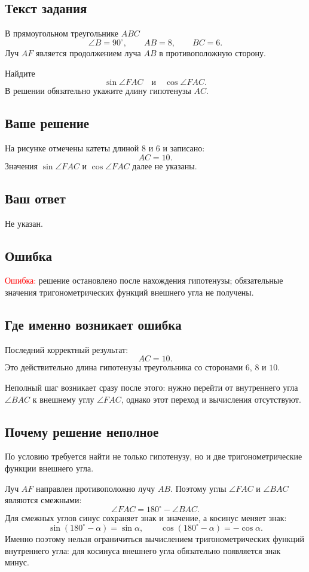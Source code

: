 \documentclass[12pt,a4paper]{article}
\begin{document}
\subsection*{Текст задания}
В прямоугольном треугольнике $ABC$
\[
\angle B=90^\circ,\qquad AB=8,\qquad BC=6.
\]
Луч $AF$ является продолжением луча $AB$ в противоположную сторону.

Найдите
\[
\sin\angle FAC
\quad\text{и}\quad
\cos\angle FAC.
\]
В решении обязательно укажите длину гипотенузы $AC$.

\subsection*{Ваше решение}
На рисунке отмечены катеты длиной $8$ и $6$ и записано:
\[
AC=10.
\]
Значения $\sin\angle FAC$ и $\cos\angle FAC$ далее не указаны.

\subsection*{Ваш ответ}
Не указан.

\subsection*{Ошибка}
\textcolor{red}{Ошибка:} решение остановлено после нахождения гипотенузы; обязательные значения тригонометрических функций внешнего угла не получены.

\subsection*{Где именно возникает ошибка}
Последний корректный результат:
\[
AC=10.
\]
Это действительно длина гипотенузы треугольника со сторонами $6$, $8$ и $10$.

Неполный шаг возникает сразу после этого: нужно перейти от внутреннего угла $\angle BAC$ к внешнему углу $\angle FAC$, однако этот переход и вычисления отсутствуют.

\subsection*{Почему решение неполное}
По условию требуется найти не только гипотенузу, но и две тригонометрические функции внешнего угла.

Луч $AF$ направлен противоположно лучу $AB$. Поэтому углы $\angle FAC$ и $\angle BAC$ являются смежными:
\[
\angle FAC=180^\circ-\angle BAC.
\]
Для смежных углов синус сохраняет знак и значение, а косинус меняет знак:
\[
\sin(180^\circ-\alpha)=\sin\alpha,
\qquad
\cos(180^\circ-\alpha)=-\cos\alpha.
\]
Именно поэтому нельзя ограничиться вычислением тригонометрических функций внутреннего угла: для косинуса внешнего угла обязательно появляется знак минус.
\end{document}
